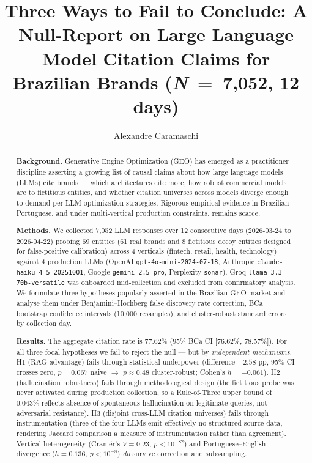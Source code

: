 \documentclass[preprint,12pt,authoryear]{elsarticle}
\begin{document}
\begin{frontmatter}

\title{Three Ways to Fail to Conclude: A Null-Report on Large Language Model Citation Claims for Brazilian Brands (\textit{N}~=~7{,}052, 12 days)}

\author[brgeo]{Alexandre Caramaschi}


\begin{abstract}
\noindent
\textbf{Background.} Generative Engine Optimization (GEO) has emerged as a practitioner discipline asserting a growing list of causal claims about how large language models (LLMs) cite brands --- which architectures cite more, how robust commercial models are to fictitious entities, and whether citation universes across models diverge enough to demand per-LLM optimization strategies. Rigorous empirical evidence in Brazilian Portuguese, and under multi-vertical production constraints, remains scarce.

\noindent
\textbf{Methods.} We collected 7{,}052 LLM responses over 12 consecutive days (2026-03-24 to 2026-04-22) probing 69 entities (61 real brands and 8 fictitious decoy entities designed for false-positive calibration) across 4 verticals (fintech, retail, health, technology) against 4 production LLMs (OpenAI \texttt{gpt-4o-mini-2024-07-18}, Anthropic \texttt{claude-haiku-4-5-20251001}, Google \texttt{gemini-2.5-pro}, Perplexity \texttt{sonar}). Groq \texttt{llama-3.3-70b-versatile} was onboarded mid-collection and excluded from confirmatory analysis. We formulate three hypotheses popularly asserted in the Brazilian GEO market and analyse them under Benjamini--Hochberg false discovery rate correction, BCa bootstrap confidence intervals (10{,}000 resamples), and cluster-robust standard errors by collection day.

\noindent
\textbf{Results.} The aggregate citation rate is 77.62\% (95\% BCa CI [76.62\%, 78.57\%]). For all three focal hypotheses we fail to reject the null --- but by \emph{independent mechanisms}. H1 (RAG advantage) fails through statistical underpower (difference $-2.58$ pp, 95\% CI crosses zero, $p=0.067$ naive $\rightarrow$ $p\approx0.48$ cluster-robust; Cohen's $h=-0.061$). H2 (hallucination robustness) fails through methodological design (the fictitious probe was never activated during production collection, so a Rule-of-Three upper bound of 0.043\% reflects absence of spontaneous hallucination on legitimate queries, not adversarial resistance). H3 (disjoint cross-LLM citation universes) fails through instrumentation (three of the four LLMs emit effectively no structured source data, rendering Jaccard comparison a measure of instrumentation rather than agreement). Vertical heterogeneity (Cram\'er's $V=0.23$, $p<10^{-82}$) and Portuguese--English divergence ($h=0.136$, $p<10^{-8}$) \emph{do} survive correction and subsampling.


\end{abstract}
\end{frontmatter}
\end{document}
